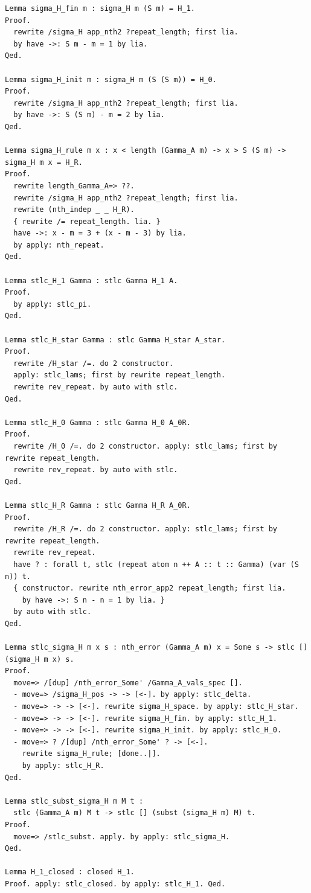 \begin{lstlisting}
Lemma sigma_H_fin m : sigma_H m (S m) = H_1.
Proof.
  rewrite /sigma_H app_nth2 ?repeat_length; first lia.
  by have ->: S m - m = 1 by lia.
Qed.

Lemma sigma_H_init m : sigma_H m (S (S m)) = H_0.
Proof.
  rewrite /sigma_H app_nth2 ?repeat_length; first lia.
  by have ->: S (S m) - m = 2 by lia.
Qed.

Lemma sigma_H_rule m x : x < length (Gamma_A m) -> x > S (S m) -> sigma_H m x = H_R.
Proof.
  rewrite length_Gamma_A=> ??.
  rewrite /sigma_H app_nth2 ?repeat_length; first lia.
  rewrite (nth_indep _ _ H_R).
  { rewrite /= repeat_length. lia. }
  have ->: x - m = 3 + (x - m - 3) by lia.
  by apply: nth_repeat.
Qed.

Lemma stlc_H_1 Gamma : stlc Gamma H_1 A.
Proof.
  by apply: stlc_pi.
Qed.

Lemma stlc_H_star Gamma : stlc Gamma H_star A_star.
Proof.
  rewrite /H_star /=. do 2 constructor.
  apply: stlc_lams; first by rewrite repeat_length.
  rewrite rev_repeat. by auto with stlc.
Qed.

Lemma stlc_H_0 Gamma : stlc Gamma H_0 A_0R.
Proof.
  rewrite /H_0 /=. do 2 constructor. apply: stlc_lams; first by rewrite repeat_length.
  rewrite rev_repeat. by auto with stlc.
Qed.

Lemma stlc_H_R Gamma : stlc Gamma H_R A_0R.
Proof.
  rewrite /H_R /=. do 2 constructor. apply: stlc_lams; first by rewrite repeat_length.
  rewrite rev_repeat.
  have ? : forall t, stlc (repeat atom n ++ A :: t :: Gamma) (var (S n)) t.
  { constructor. rewrite nth_error_app2 repeat_length; first lia.
    by have ->: S n - n = 1 by lia. }
  by auto with stlc.
Qed.

Lemma stlc_sigma_H m x s : nth_error (Gamma_A m) x = Some s -> stlc [] (sigma_H m x) s.
Proof.
  move=> /[dup] /nth_error_Some' /Gamma_A_vals_spec [].
  - move=> /sigma_H_pos -> -> [<-]. by apply: stlc_delta.
  - move=> -> -> [<-]. rewrite sigma_H_space. by apply: stlc_H_star.
  - move=> -> -> [<-]. rewrite sigma_H_fin. by apply: stlc_H_1.
  - move=> -> -> [<-]. rewrite sigma_H_init. by apply: stlc_H_0.
  - move=> ? /[dup] /nth_error_Some' ? -> [<-].
    rewrite sigma_H_rule; [done..|].
    by apply: stlc_H_R.
Qed.

Lemma stlc_subst_sigma_H m M t : 
  stlc (Gamma_A m) M t -> stlc [] (subst (sigma_H m) M) t.
Proof.
  move=> /stlc_subst. apply. by apply: stlc_sigma_H.
Qed.

Lemma H_1_closed : closed H_1.
Proof. apply: stlc_closed. by apply: stlc_H_1. Qed.


\end{lstlisting}
